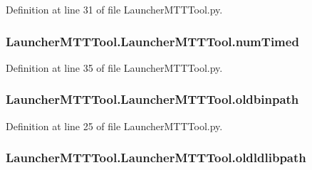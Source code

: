Definition at line 31 of file Launcher\-M\-T\-T\-Tool.\-py.

\hypertarget{class_launcher_m_t_t_tool_1_1_launcher_m_t_t_tool_ae2be62c3d068b4c1c3d7c1ddaf4cfdbe}{
\subsubsection[{num\-Timed}]{\setlength{\rightskip}{0pt plus 5cm}Launcher\-M\-T\-T\-Tool.\-Launcher\-M\-T\-T\-Tool.\-num\-Timed}}\label{class_launcher_m_t_t_tool_1_1_launcher_m_t_t_tool_ae2be62c3d068b4c1c3d7c1ddaf4cfdbe}


Definition at line 35 of file Launcher\-M\-T\-T\-Tool.\-py.

\hypertarget{class_launcher_m_t_t_tool_1_1_launcher_m_t_t_tool_acf34764e2b173537cbf5720cc0a1235d}{
\subsubsection[{oldbinpath}]{\setlength{\rightskip}{0pt plus 5cm}Launcher\-M\-T\-T\-Tool.\-Launcher\-M\-T\-T\-Tool.\-oldbinpath}}\label{class_launcher_m_t_t_tool_1_1_launcher_m_t_t_tool_acf34764e2b173537cbf5720cc0a1235d}


Definition at line 25 of file Launcher\-M\-T\-T\-Tool.\-py.

\hypertarget{class_launcher_m_t_t_tool_1_1_launcher_m_t_t_tool_abb2e78c53544b045ef3ab42ed8b68806}{
\subsubsection[{oldldlibpath}]{\setlength{\rightskip}{0pt plus 5cm}Launcher\-M\-T\-T\-Tool.\-Launcher\-M\-T\-T\-Tool.\-oldldlibpath}}\label{class_launcher_m_t_t_tool_1_1_launcher_m_t_t_tool_abb2e78c53544b045ef3ab42ed8b68806}


